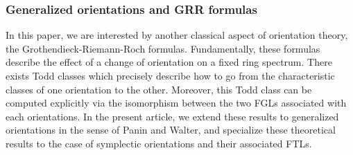\documentclass[11pt,leqno]{amsart}
\theoremstyle{remark}
\theoremstyle{definition}
\numberwithin{equation}{thm}
\begin{document}
\subsubsection*{Generalized orientations and GRR formulas}

In this paper, we are interested by another classical aspect of orientation theory,
 the Grothendieck-Riemann-Roch formulas. Fundamentally, these formulas describe
 the effect of a change of orientation on a fixed ring spectrum. There exists Todd
 classes which precisely describe how to go from the characteristic classes of one orientation
 to the other. Moreover, this Todd class can be computed explicitly via the isomorphism
 between the two FGLs associated with each orientations.
 In the present article,
 we extend these results to generalized orientations in the sense of Panin and Walter,
 and specialize these theoretical results to the case of symplectic orientations
 and their associated FTLs. 
\end{document}
